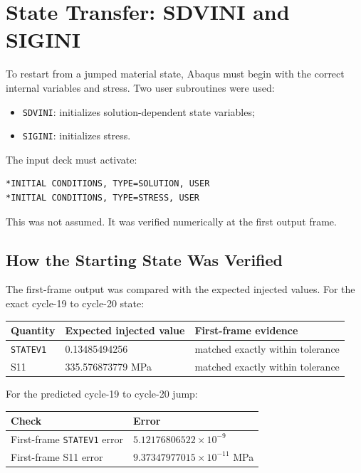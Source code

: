 \documentclass[11pt,a4paper]{article}
\begin{document}
\section{State Transfer: SDVINI and SIGINI}

To restart from a jumped material state, Abaqus must begin with the correct internal variables and stress. Two user subroutines were used:

\begin{itemize}
  \item \texttt{SDVINI}: initializes solution-dependent state variables;
  \item \texttt{SIGINI}: initializes stress.
\end{itemize}

The input deck must activate:

\begin{verbatim}
*INITIAL CONDITIONS, TYPE=SOLUTION, USER
*INITIAL CONDITIONS, TYPE=STRESS, USER
\end{verbatim}

This was not assumed. It was verified numerically at the first output frame.

\subsection{How the Starting State Was Verified}

The first-frame output was compared with the expected injected values. For the exact cycle-19 to cycle-20 state:

\begin{center}
\begin{tabular}{lll}
\toprule
Quantity & Expected injected value & First-frame evidence \\
\midrule
\texttt{STATEV1} & 0.13485494256 & matched exactly within tolerance \\
S11 & 335.576873779 MPa & matched exactly within tolerance \\
\bottomrule
\end{tabular}
\end{center}

For the predicted cycle-19 to cycle-20 jump:

\begin{center}
\begin{tabular}{ll}
\toprule
Check & Error \\
\midrule
First-frame \texttt{STATEV1} error & $5.12176806522\times10^{-9}$ \\
First-frame S11 error & $9.37347977015\times10^{-11}$ MPa \\
\bottomrule
\end{tabular}
\end{center}
\end{document}
